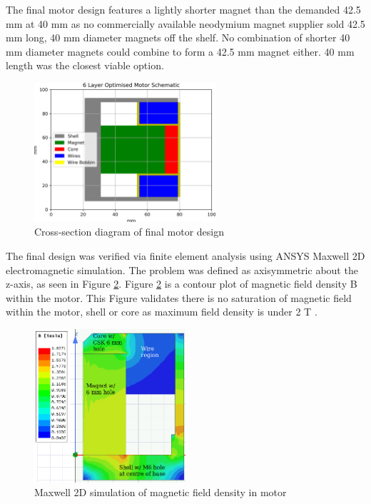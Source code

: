 \documentclass[a4paper,12pt]{article}
\begin{document}
The final motor design features a lightly shorter magnet than the demanded 42.5 mm at 40 mm as no commercially available neodymium magnet supplier sold 42.5 mm long, 40 mm diameter magnets off the shelf. No combination of shorter 40 mm diameter magnets could combine to form a 42.5 mm magnet either. 40 mm length was the closest viable option.

\begin{figure}[h!]
    \centering
    \includegraphics[width=0.6\textwidth]{finalDesign_layers.png}
    \caption{Cross-section diagram of final motor design}
    \label{fg:finalmotor}
\end{figure}

The final design was verified via finite element analysis using ANSYS Maxwell 2D electromagnetic simulation. The problem was defined as axisymmetric about the z-axis, as seen in Figure \ref{fg:maxwellB}. Figure \ref{fg:maxwellB} is a contour plot of magnetic field density B within the motor. This Figure validates there is no saturation of magnetic field within the motor, shell or core as maximum field density is under 2 T \cite{mclymanMagneticMaterialsTheir2004}.

\begin{figure}[h!]
    \centering
    \includegraphics[width=0.5\textwidth]{maxwell.png}
    \caption{Maxwell 2D simulation of magnetic field density in motor}
    \label{fg:maxwellB}
\end{figure}
\end{document}
